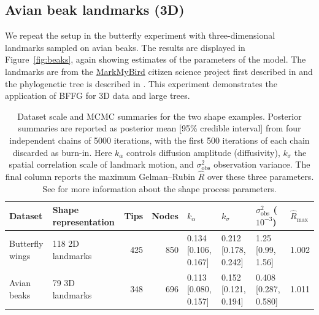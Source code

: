 \documentclass[unnumsec,webpdf,contemporary,large]{oup-authoring-template}
\begin{document}
\subsection{Avian beak landmarks (3D)}
We repeat the setup in the butterfly experiment with three-dimensional landmarks sampled on avian beaks. The results are displayed in Figure~\ref{fig:beaks}, again showing estimates of the parameters of the model. The landmarks are from the \href{http://www.markmybird.org}{MarkMyBird} citizen science project first described in \citet{cooney2017mega} and the phylogenetic tree is described in \citet{stiller2024complexity}. This experiment demonstrates the application of BFFG for 3D data and large trees.

\begin{table}[t]
\centering
\small
\setlength{\tabcolsep}{4pt}
\caption[Dataset info and MCMC summaries for the two shape examples.]{Dataset scale and MCMC summaries for the two shape examples. Posterior summaries are reported as posterior mean [95\% credible interval] from four independent chains of 5000 iterations, with the first 500 iterations of each chain discarded as burn-in. Here $k_\alpha$ controls diffusion amplitude (diffusivity), $k_\sigma$ the spatial correlation scale of landmark motion, and $\sigma^2_{\mathrm{obs}}$ observation variance. The final column reports the maximum Gelman--Rubin $\hat R$ over these three parameters. See \cite{stroustrup2026stochastic} for more information about the shape process parameters.}
\begin{tabular}{@{}llrrllll@{}}
\toprule
Dataset & Shape representation & Tips & Nodes & $k_\alpha$ & $k_\sigma$ & $\sigma^2_{\mathrm{obs}}$ ($10^{-3}$) & $\hat R_{\max}$ \\
\midrule
Butterfly wings & 118 2D landmarks & 425 & 850 & 0.134 [0.106, 0.167] & 0.212 [0.178, 0.242] & 1.25 [0.99, 1.56] & 1.002 \\
Avian beaks & 79 3D landmarks & 348 & 696 & 0.113 [0.080, 0.157] & 0.152 [0.121, 0.194] & 0.408 [0.287, 0.580] & 1.011 \\
\bottomrule
\end{tabular}
\label{tab:mcmc-summary}
\end{table}
\end{document}
